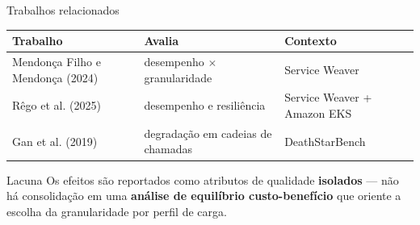 \begin{frame}{Trabalhos relacionados}
    \begin{center}
    \small
    \begin{tabular}{p{3.6cm} p{3.3cm} p{3.1cm}}
        \textbf{Trabalho} & \textbf{Avalia} & \textbf{Contexto} \\
        \hline
        Mendonça Filho e Mendonça (2024) & desempenho $\times$ granularidade & Service Weaver \\
        Rêgo et al. (2025) & desempenho e resiliência & Service Weaver + Amazon EKS \\
        Gan et al. (2019) & degradação em cadeias de chamadas & DeathStarBench \\
        \hline
    \end{tabular}
    \end{center}
    \begin{alertblock}{Lacuna}
        \small Os efeitos são reportados como atributos de qualidade \textbf{isolados} --- não há consolidação em uma \textbf{análise de equilíbrio custo-benefício} que oriente a escolha da granularidade por perfil de carga.
    \end{alertblock}
\end{frame}
